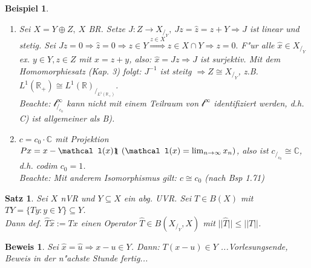 \documentclass[a4paper,11pt]{book}
\newcommand{\R}{{\mathbb R}}
\newcommand{\C}{{\mathbb C}}
\newcommand{\ssl}{{\mathcal l}}
\newcommand{\id}{1\hspace{-0,9ex}\raisebox{-0,2ex}{1}}
\newtheorem{Sa}[Def]{Satz}
\newtheorem{Bsp}[Def]{Beispiel}
\theoremstyle{nonumberplain}
\newtheorem{Bew}[Def]{Beweis}
\begin{document}
\begin{Bsp}
\begin{enumerate}
\item[a)] Sei $X = Y \oplus Z,\ X$ BR. Setze $J: Z \rightarrow X_{/_Y},\ Jz = \hat{z} = z+Y \Rightarrow J$ ist linear und stetig. Sei $Jz = 0 \Rightarrow \hat{z} = 0 \Rightarrow z \in Y \stackrel{z \in X}{\Rightarrow} z \in X \cap Y \Rightarrow z = 0.$ F"ur alle $\hat{x} \in X_{/_Y}$ ex. $y \in Y, z \in Z$ mit $x = z+y$, also: $\hat{x} = Jz \Rightarrow J$ ist surjektiv. Mit dem Homomorphiesatz (Kap. 3) folgt: $J^{-1}$ ist steitg $\Rightarrow Z \cong X_{/_Y}$, z.B. $L^1(\R_+) \cong L^1(\R)_{/_{L^1(\R_+)}}$.\\
Beachte: $\mathcal l_{/_{c_0}}^{\infty}$ kann nicht mit einem Teilraum von $\ssl^{\infty}$ identifiziert werden, d.h. C) ist allgemeiner als B).

\item[b)] $c = c_0 \cdot \C$ mit Projektion $Px = x - \ssl(x) \id \ (\ssl(x)=\lim_{n \rightarrow \infty} x_n)$, also ist $c_{/_{c_0}} \cong \C$, d.h. codim $c_0 = 1$.\\
Beachte: Mit anderem Isomorphismus gilt: $c \cong c_0$ (nach Bsp 1.71)
\end{enumerate}
\end{Bsp}

\begin{Sa}
Sei $X$ nVR und $Y \subseteq X$ ein abg. UVR. Sei $T \in B(X)$ mit $TY = \{ Ty: y \in Y \} \subseteq Y$.\\
Dann def. $\hat{T} \hat{x} := Tx$ einen Operator $\hat{T} \in B(X_{/_Y},X)$ mit $||\hat{T}|| \leq ||T||$.
\end{Sa}

\begin{Bew}
Sei $\hat{x} = \hat{u} \Rightarrow x-u \in Y$. Dann: $T(x-u) \in Y$
...Vorlesungsende, Beweis in der n"achste Stunde fertig...
\end{Bew}
\end{document}
